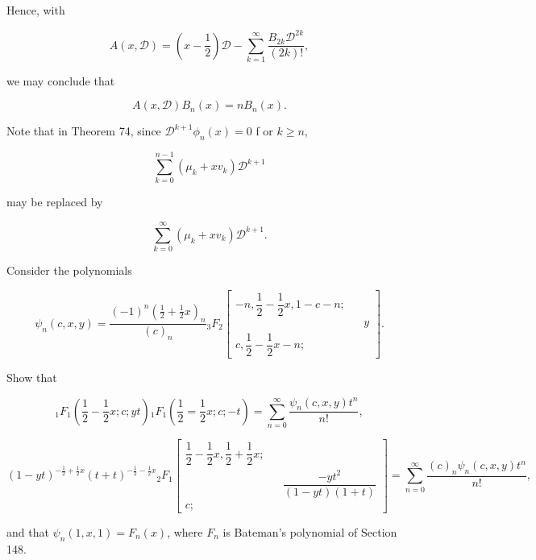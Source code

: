 \begin{solution}
Hence, with

$$A(x,\mathscr{D}) = \left( x - \dfrac{1}{2} \right) \mathscr{D} - \displaystyle\sum_{k=1}^{\infty} \dfrac{B_{2k} \mathscr{D}^{2k}}{(2k)!},$$

we may conclude that

$$A(x ,\mathscr{D}) B_n(x) = n B_n(x).$$

Note that in Theorem 74, since $\mathscr{D}^{k+1} \phi_n(x) =0$ f or $k \geq n$, 

$$\displaystyle\sum_{k=0}^{n-1} (\mu_k+x v_k)\mathscr{D}^{k+1}$$

may be replaced by

$$\displaystyle\sum_{k=0}^{\infty} (\mu_k + x v_k) \mathscr{D}^{k+1}.$$
\end{solution}
\begin{problem}\label{problem3chapter18}
Consider the polynomials

$$\psi_n(c,x,y) = \dfrac{(-1)^n (\frac{1}{2}+\frac{1}{2}x)_n}{(c)_n} {}_3F_2 \left[ \begin{array}{rlr}
-n, \dfrac{1}{2} - \dfrac{1}{2}x, 1 -c-n; & & \\
& & y \\
c, \dfrac{1}{2} - \dfrac{1}{2}x - n; & & 
\end{array} \right].$$

Show that

$${}_1F_1 \left( \dfrac{1}{2} - \dfrac{1}{2}x; c; yt \right) {}_1F_1 \left( \dfrac{1}{2} = \dfrac{1}{2}x; c;-t \right) = \displaystyle\sum_{n=0}^{\infty} \dfrac{\psi_n(c,x,y)t^n}{n!},$$

$$(1-yt)^{-\frac{1}{2}+\frac{1}{2}x}(t+t)^{-\frac{1}{2}-\frac{1}{2}x} {}_2F_1 \left[ \begin{array}{rlr}
\dfrac{1}{2} - \dfrac{1}{2}x, \dfrac{1}{2} + \dfrac{1}{2}x; & & \\
& & \dfrac{-yt^2}{(1-yt)(1+t)} \\
c; & & 
\end{array} \right] = \displaystyle\sum_{n=0}^{\infty} \dfrac{(c)_n \psi_n(c,x,y)t^n}{n!},$$

and that $\psi_n(1,x,1) = F_n(x)$, where $F_n$ is Bateman's polynomial of Section 148.
\end{problem}
